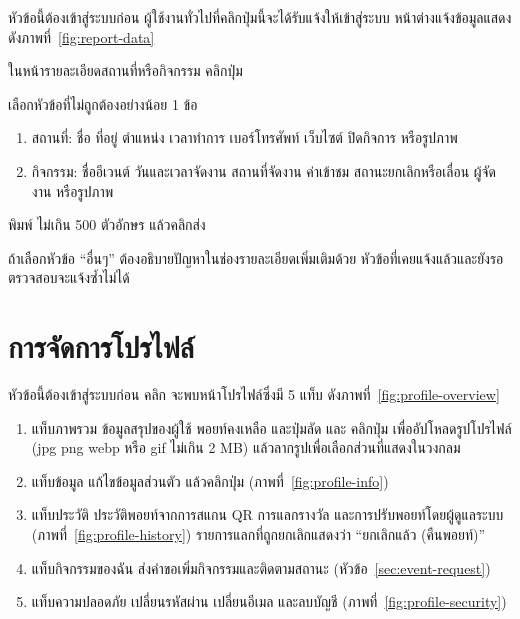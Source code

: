 หัวข้อนี้ต้องเข้าสู่ระบบก่อน ผู้ใช้งานทั่วไปที่คลิกปุ่มนี้จะได้รับแจ้งให้เข้าสู่ระบบ หน้าต่างแจ้งข้อมูลแสดงดังภาพที่~\ref{fig:report-data}


\begin{steps}
  \item ในหน้ารายละเอียดสถานที่หรือกิจกรรม คลิกปุ่ม 
  \item เลือกหัวข้อที่ไม่ถูกต้องอย่างน้อย 1 ข้อ
        \begin{enumerate}
          \item สถานที่: ชื่อ ที่อยู่ ตำแหน่ง เวลาทำการ เบอร์โทรศัพท์ เว็บไซต์ ปิดกิจการ หรือรูปภาพ
          \item กิจกรรม: ชื่ออีเวนต์ วันและเวลาจัดงาน สถานที่จัดงาน ค่าเข้าชม สถานะยกเลิกหรือเลื่อน ผู้จัดงาน หรือรูปภาพ
        \end{enumerate}
  \item พิมพ์  ไม่เกิน 500 ตัวอักษร แล้วคลิกส่ง
\end{steps}

\begin{note}
ถ้าเลือกหัวข้อ ``อื่นๆ'' ต้องอธิบายปัญหาในช่องรายละเอียดเพิ่มเติมด้วย หัวข้อที่เคยแจ้งแล้วและยังรอตรวจสอบจะแจ้งซ้ำไม่ได้
\end{note}

\section{การจัดการโปรไฟล์}
\label{sec:profile}

หัวข้อนี้ต้องเข้าสู่ระบบก่อน คลิก  จะพบหน้าโปรไฟล์ซึ่งมี 5 แท็บ ดังภาพที่~\ref{fig:profile-overview}


\begin{enumerate}
\item แท็บภาพรวม ข้อมูลสรุปของผู้ใช้ พอยท์คงเหลือ และปุ่มลัด  และ  คลิกปุ่ม  เพื่ออัปโหลดรูปโปรไฟล์ (jpg png webp หรือ gif ไม่เกิน 2 MB) แล้วลากรูปเพื่อเลือกส่วนที่แสดงในวงกลม
\item แท็บข้อมูล แก้ไขข้อมูลส่วนตัว แล้วคลิกปุ่ม  (ภาพที่~\ref{fig:profile-info})
\item แท็บประวัติ ประวัติพอยท์จากการสแกน QR การแลกรางวัล และการปรับพอยท์โดยผู้ดูแลระบบ (ภาพที่~\ref{fig:profile-history}) รายการแลกที่ถูกยกเลิกแสดงว่า ``ยกเลิกแล้ว (คืนพอยท์)''
\item แท็บกิจกรรมของฉัน ส่งคำขอเพิ่มกิจกรรมและติดตามสถานะ (หัวข้อ~\ref{sec:event-request})
\item แท็บความปลอดภัย เปลี่ยนรหัสผ่าน เปลี่ยนอีเมล และลบบัญชี (ภาพที่~\ref{fig:profile-security})
\end{enumerate}


